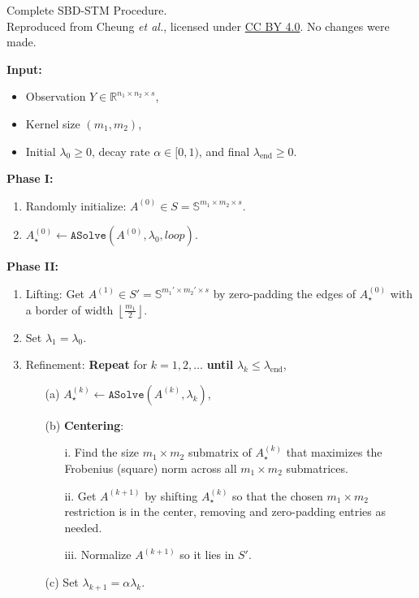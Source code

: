 \begin{algorithm}
	\label{SBDalgo}
	\caption{Complete SBD-STM Procedure. \\
			\small Reproduced from Cheung \textit{et al.}, licensed under 
			\href{http://creativecommons.org/licenses/by/4.0/}{CC BY 4.0}. 
			No changes were made.}
	\textbf{Input:}
	\begin{itemize}
		\item Observation $Y \in \mathbb{R}^{n_1 \times n_2 \times s}$,
		\item Kernel size $(m_1, m_2)$,
		\item Initial $\lambda_0 \geq 0$, decay rate $\alpha \in [0,1)$, and final $\lambda_{\text{end}} \geq 0$.
	\end{itemize}
	
	\textbf{Phase I:}
	\begin{enumerate}
		\item Randomly initialize: $A^{(0)} \in S = \mathbb{S}^{m_1 \times m_2 \times s}$.
		\item $A_\star^{(0)} \leftarrow \texttt{ASolve}(A^{(0)}, \lambda_0, loop)$.
	\end{enumerate}
	
	\textbf{Phase II:}
	\begin{enumerate}
		\item Lifting: Get $A^{(1)} \in S' = \mathbb{S}^{m_1' \times m_2' \times s}$ by zero-padding the edges of $A_\star^{(0)}$ with a border of width $\left\lfloor \frac{m_1}{2} \right\rfloor$.
		\item Set $\lambda_1 = \lambda_0$.
		\item Refinement: \textbf{Repeat} for $k = 1, 2, \dots$ \textbf{until} $\lambda_k \leq \lambda_{\text{end}}$,
		\begin{enumerate}
			\item[(a)] $A_\star^{(k)} \leftarrow \texttt{ASolve}(A^{(k)}, \lambda_k)$,
			\item[(b)] \textbf{Centering}:
			\begin{enumerate}
				\item[i.] Find the size $m_1 \times m_2$ submatrix of $A_\star^{(k)}$ that maximizes the Frobenius (square) norm across all $m_1 \times m_2$ submatrices.
				\item[ii.] Get $A^{(k+1)}$ by shifting $A_\star^{(k)}$ so that the chosen $m_1 \times m_2$ restriction is in the center, removing and zero-padding entries as needed.
				\item[iii.] Normalize $A^{(k+1)}$ so it lies in $S'$.
			\end{enumerate}
			\item[(c)] Set $\lambda_{k+1} = \alpha \lambda_k$.
		\end{enumerate}
	\end{enumerate}
	

\end{algorithm}
